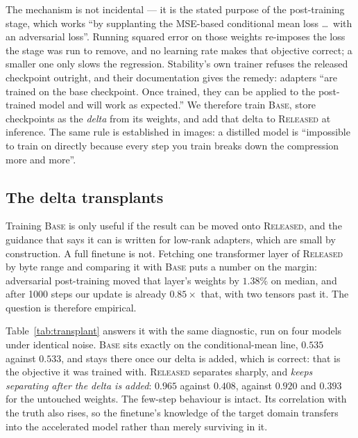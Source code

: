 \documentclass[10pt,twocolumn,letterpaper]{article}
\begin{document}
The mechanism is not incidental --- it is the stated purpose of the post-training
stage, which works ``by supplanting the MSE-based conditional mean loss \dots\
with an adversarial loss''. Running squared error on those weights re-imposes the
loss the stage was run to remove, and no learning rate makes that objective
correct; a smaller one only slows the regression. Stability's own trainer refuses
the released checkpoint outright, and their documentation gives the remedy:
adapters ``are trained on the base checkpoint. Once trained, they can be applied
to the post-trained model and will work as expected.'' We therefore train
\textsc{Base}, store checkpoints as the \emph{delta} from its weights, and add
that delta to \textsc{Released} at inference. The same rule is established in
images: a distilled model is ``impossible to train on directly because every step
you train breaks down the compression more and more''.


\subsection{The delta transplants}
\label{sec:transplant}

Training \textsc{Base} is only useful if the result can be moved onto
\textsc{Released}, and the guidance that says it can is written for low-rank
adapters, which are small by construction. A full finetune is not. Fetching one
transformer layer of \textsc{Released} by byte range and comparing it with
\textsc{Base} puts a number on the margin: adversarial post-training moved that
layer's weights by $1.38\%$ on median, and after 1000 steps our update is already
$0.85\times$ that, with two tensors past it. The question is therefore empirical.

Table~\ref{tab:transplant} answers it with the same diagnostic, run on four
models under identical noise. \textsc{Base} sits exactly on the conditional-mean
line, $0.535$ against $0.533$, and stays there once our delta is added, which is
correct: that is the objective it was trained with. \textsc{Released} separates
sharply, and \emph{keeps separating after the delta is added}: $0.965$ against
$0.408$, against $0.920$ and $0.393$ for the untouched weights. The few-step
behaviour is intact. Its correlation with the truth also rises, so the finetune's
knowledge of the target domain transfers into the accelerated model rather than
merely surviving in it.
\end{document}
